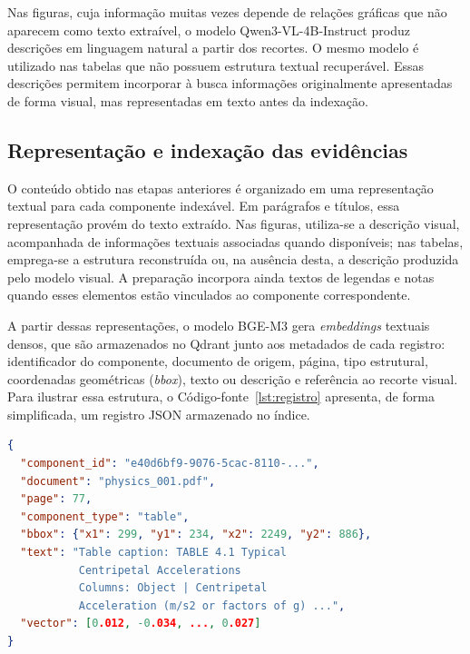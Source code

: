 Nas figuras, cuja informação muitas vezes depende de relações gráficas que não aparecem como texto extraível, o modelo Qwen3-VL-4B-Instruct produz descrições em linguagem natural a partir dos recortes. O mesmo modelo é utilizado nas tabelas que não possuem estrutura textual recuperável. Essas descrições permitem incorporar à busca informações originalmente apresentadas de forma visual, mas representadas em texto antes da indexação.

\subsection{Representação e indexação das evidências}
\label{subsec:fase6_indexacao_hibrida}

O conteúdo obtido nas etapas anteriores é organizado em uma representação textual para cada componente indexável. Em parágrafos e títulos, essa representação provém do texto extraído. Nas figuras, utiliza-se a descrição visual, acompanhada de informações textuais associadas quando disponíveis; nas tabelas, emprega-se a estrutura reconstruída ou, na ausência desta, a descrição produzida pelo modelo visual. A preparação incorpora ainda textos de legendas e notas quando esses elementos estão vinculados ao componente correspondente.

A partir dessas representações, o modelo BGE-M3 gera \textit{embeddings} textuais densos, que são armazenados no Qdrant junto aos metadados de cada registro: identificador do componente, documento de origem, página, tipo estrutural, coordenadas geométricas (\textit{bbox}), texto ou descrição e referência ao recorte visual. Para ilustrar essa estrutura, o Código-fonte~\ref{lst:registro} apresenta, de forma simplificada, um registro JSON armazenado no índice.

\noindent\begin{minipage}{\textwidth}
\begin{lstlisting}[language=json,basicstyle=\ttfamily\footnotesize,frame=single,aboveskip=0.25cm,belowskip=0.10cm,caption={Exemplo simplificado de um registro JSON indexado no Qdrant.},label={lst:registro}]
{
  "component_id": "e40d6bf9-9076-5cac-8110-...",
  "document": "physics_001.pdf",
  "page": 77,
  "component_type": "table",
  "bbox": {"x1": 299, "y1": 234, "x2": 2249, "y2": 886},
  "text": "Table caption: TABLE 4.1 Typical
           Centripetal Accelerations
           Columns: Object | Centripetal
           Acceleration (m/s2 or factors of g) ...",
  "vector": [0.012, -0.034, ..., 0.027]
}
\end{lstlisting}
\end{minipage}\vspace{0.35cm}

